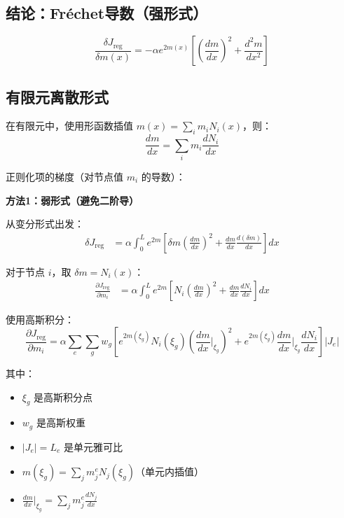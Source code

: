 \documentclass{article}
\begin{document}
\subsection*{结论：Fréchet导数（强形式）}

\begin{equation}
\boxed{
\frac{\delta J_{\text{reg}}}{\delta m(x)} = -\alpha e^{2m(x)} \left[ \left(\frac{dm}{dx}\right)^2 + \frac{d^2m}{dx^2} \right]
}
\end{equation}

\subsection*{有限元离散形式}

在有限元中，使用形函数插值 $m(x) = \sum_i m_i N_i(x)$，则：
\begin{equation}
\frac{dm}{dx} = \sum_i m_i \frac{dN_i}{dx}
\end{equation}

正则化项的梯度（对节点值 $m_i$ 的导数）：

\textbf{方法1：弱形式（避免二阶导）}

从变分形式出发：
\begin{align}
\delta J_{\text{reg}} &= \alpha \int_0^L e^{2m} \left[ \delta m \left(\frac{dm}{dx}\right)^2 + \frac{dm}{dx} \frac{d(\delta m)}{dx} \right] dx
\end{align}

对于节点 $i$，取 $\delta m = N_i(x)$：
\begin{align}
\frac{\partial J_{\text{reg}}}{\partial m_i} &= \alpha \int_0^L e^{2m} \left[ N_i \left(\frac{dm}{dx}\right)^2 + \frac{dm}{dx} \frac{dN_i}{dx} \right] dx
\end{align}

使用高斯积分：
\begin{equation}
\boxed{
\frac{\partial J_{\text{reg}}}{\partial m_i} = \alpha \sum_{e} \sum_{g} w_g \left[ e^{2m(\xi_g)} N_i(\xi_g) \left(\frac{dm}{dx}\big|_{\xi_g}\right)^2 + e^{2m(\xi_g)} \frac{dm}{dx}\big|_{\xi_g} \frac{dN_i}{dx} \right] |J_e|
}
\end{equation}

其中：
\begin{itemize}
\item $\xi_g$ 是高斯积分点
\item $w_g$ 是高斯权重
\item $|J_e| = L_e$ 是单元雅可比
\item $m(\xi_g) = \sum_j m_j^e N_j(\xi_g)$（单元内插值）
\item $\frac{dm}{dx}\big|_{\xi_g} = \sum_j m_j^e \frac{dN_j}{dx}$
\end{itemize}
\end{document}
